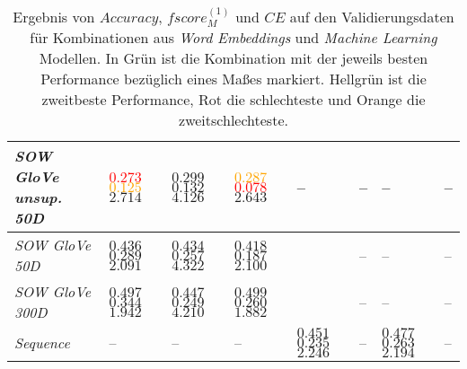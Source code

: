 \documentclass[a4paper,11pt]{article}
\begin{document}
\begin{table}[ht]
\begin{center}
\begin{tabular}{|m{2cm}||m{1.4cm}m{1.4cm}m{1.4cm}m{1.4cm}m{1.4cm}m{1.4cm}m{1.4cm}|}
 \hline
\textit{SOW GloVe unsup. 50D} & \textcolor{red}{$0.273$} \newline \textcolor{orange}{$0.125$} \newline $2.714$ & $0.299$ \newline $0.132$ \newline $4.126$ & \textcolor{orange}{$0.287$} \newline \textcolor{red}{$0.078$} \newline $2.643$ & -- & -- & -- & -- \\
 \hline
\textit{SOW GloVe 50D} & $0.436$ \newline $0.289$ \newline $2.091$ & $0.434$ \newline $0.257$ \newline $4.322$ & $0.418$ \newline $0.187$ \newline $2.100$ & & -- & -- & -- \\
 \hline
\textit{SOW GloVe 300D}  & $0.497$ \newline $0.344$ \newline $1.942$ & $0.447$ \newline $0.249$ \newline $4.210$ & $0.499$ \newline $0.260$ \newline $1.882$ & & -- & -- & -- \\
 \hline
\textit{Sequence} & -- & -- & -- & $0.451$ \newline $0.235$ \newline $2.246$ & -- & $0.477$ \newline $0.263$ \newline $2.194$ & -- \\
   \hline
\end{tabular}

  \caption{Ergebnis von $Accuracy$, $fscore_M^{(1)}$ und $CE$ auf den Validierungsdaten für Kombinationen aus \textit{Word Embeddings} und \textit{Machine Learning} Modellen. In Grün ist die Kombination mit der jeweils besten Performance bezüglich eines Maßes markiert. Hellgrün ist die zweitbeste Performance, Rot die schlechteste und Orange die zweitschlechteste.}  
  \label{tab:preselection}
\end{center}
\end{table}
\end{document}

